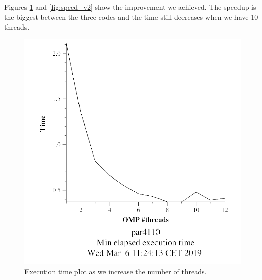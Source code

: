 \documentclass[12pt, a4paper]{article}
\begin{document}
Figures \ref{fig:min_v2} and \ref{fig:speed_v2} show the improvement we achieved. The speedup is the biggest between the three codes and the time still decreases when we have 10 threads.

\begin{figure}[H]
\begin{minipage}[b]{0.45\linewidth}
\centering
\includegraphics[width=\textwidth]{./images/min_v1}
\caption{Execution time plot as we increase the number of threads.}
\label{fig:min_v2}
\end{minipage}
\hspace{0.5cm}
\begin{minipage}[b]{0.45\linewidth}
\centering

\end{minipage}
\end{figure}
\end{document}
